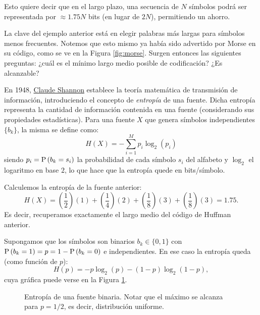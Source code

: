 \begin{ejemplo}
Esto quiere decir que en el largo plazo, una secuencia de $N$ símbolos podrá ser representada por $\approx 1.75 N$ bits (en lugar de $2N$), permitiendo un ahorro.
\end{ejemplo}

La clave del ejemplo anterior está en elegir palabras más largas para símbolos menos frecuentes. Notemos que esto mismo ya había sido advertido por Morse en su código, como se ve en la Figura \ref{fig:morse}. Surgen entonces las siguientes preguntas: ¿cuál es el mínimo largo medio posible de codificación? ¿Es alcanzable?

En 1948, \href{https://en.wikipedia.org/wiki/Claude_Shannon}{Claude Shannon} establece la teoría matemática de transmisión de información, introduciendo el concepto de \emph{entropía} de una fuente. Dicha entropía representa la cantidad de información contenida en una fuente (considerando sus propiedades estadísticas). Para una fuente $X$ que genera símbolos independientes $\{b_k\}$, la misma se define como:
\begin{equation*}
    H(X) = -\sum_{i=1}^{M} p_i \log_2(p_i)
\end{equation*}
siendo $p_i=\mathrm{P}\left(b_k=s_i\right)$ la probabilidad de cada símbolo $s_i$ del alfabeto y $\log_2$ el logaritmo en base $2$, lo que hace que la entropía quede en bits/símbolo.

Calculemos la entropía de la fuente anterior:
\begin{equation*}
    H(X) = \left(\frac{1}{2}\right)(1) + \left(\frac{1}{4}\right)(2) + \left(\frac{1}{8}\right)(3) + \left(\frac{1}{8}\right)(3) = 1.75.
\end{equation*}
Es decir, recuperamos exactamente el largo medio del código de Huffman anterior.

\begin{ejemplo}\label{ej:entropia binaria}
    Supongamos que los símbolos son binarios $b_k\in\{0,1\}$ con $\mathrm{P}\left(b_k=1\right) = p = 1-\mathrm{P}\left(b_k=0\right)$ e independientes. En ese caso la entropía queda (como función de $p$):
    \begin{equation}\label{eq:entropia binaria}
        H(p) = -p\log_2 (p) - (1-p) \log_2(1-p),
    \end{equation}
    cuya gráfica puede verse en la Figura \ref{fig:entropia binaria}.
\end{ejemplo}


\begin{figure}
    \begin{center}
    \end{center}
    \caption{Entropía de una fuente binaria. Notar que el máximo se alcanza para $p=1/2$, es decir, distribución uniforme.}\label{fig:entropia binaria}
\end{figure}

